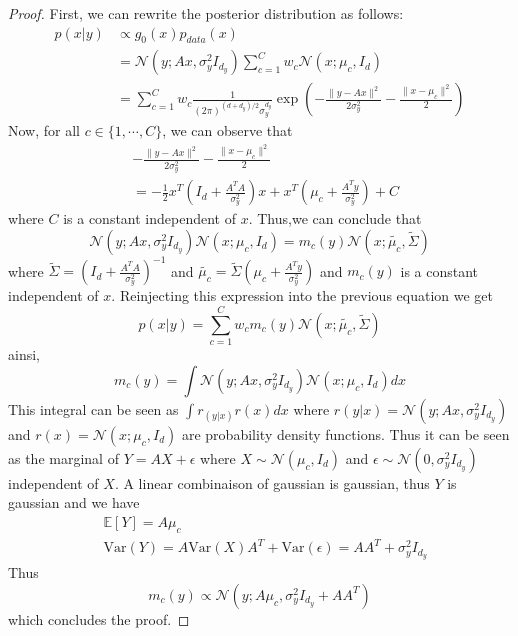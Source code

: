 \documentclass[12pt]{article}
\begin{document}
\begin{proof}
    First, we can rewrite the posterior distribution as follows:
    \begin{align*}
        p(x|y) 
        &\propto g_0(x) p_{data}(x) \\
        & = \mathcal{N}(y; Ax, \sigma_y^2 I_{d_y}) \sum_{c=1}^C w_c \mathcal{N}(x; \mu_c, I_d) \\
        & = \sum_{c=1}^C w_c \frac{1}{(2 \pi)^{(d + d_y)/2} \sigma_y^{d_y}} 
        \exp\left( -\frac{\| y - A x \|^2}{2 \sigma_y^2} - \frac{\| x - \mu_c \|^2}{2} \right)
    \end{align*}
    Now, for all $c \in \{1, \cdots, C\}$, we can observe that
    \begin{align*}
        & -\frac{\| y - A x \|^2}{2 \sigma_y^2} - \frac{\| x - \mu_c \|^2}{2} \\
        & = -\frac{1}{2} x^T (I_d + \frac{A^T A}{\sigma_y^2}) x + x^T (\mu_c + \frac{A^T y}{\sigma_y^2}) + C
    \end{align*}
    where $C$ is a constant independent of $x$. Thus,we can conclude that
    \begin{equation}
        \mathcal{N}(y; Ax, \sigma_y^2 I_{d_y}) \mathcal{N}(x; \mu_c, I_d)
        = m_c(y) \mathcal{N}(x; \tilde{\mu_c}, \tilde{\Sigma})
    \end{equation}
    where $\tilde{\Sigma} = (I_d + \frac{A^T A}{\sigma_y^2})^{-1}$ and 
    $\tilde{\mu_c} = \tilde{\Sigma} (\mu_c + \frac{A^T y}{\sigma_y^2})$ and $m_c(y)$ is a constant
    independent of $x$.
    Reinjecting this expression into the previous equation we get 
    \begin{equation}
        p(x|y) = \sum_{c=1}^C w_c m_c(y) \mathcal{N}(x; \tilde{\mu_c}, \tilde{\Sigma})
    \end{equation}
    ainsi,
    $$m_c(y) = \int  \mathcal{N}(y; Ax, \sigma_y^2 I_{d_y}) \mathcal{N}(x; \mu_c, I_d) dx$$
    This integral can be seen as $\int r_(y|x) r(x) dx$ where $r(y|x) = \mathcal{N}(y; Ax, \sigma_y^2 I_{d_y})$
    and $r(x) = \mathcal{N}(x; \mu_c, I_d)$ are probability density functions. Thus it can be seen as 
    the marginal of $Y = AX + \epsilon$
    where $X \sim \mathcal{N}(\mu_c, I_d)$ and $\epsilon \sim \mathcal{N}(0, \sigma_y^2 I_{d_y})$ 
    independent of $X$.
    A linear combinaison of gaussian is gaussian, thus $Y$ is gaussian and we have
    \begin{align*}
        & \mathbb{E}[Y] = A \mu_c \\
        & \text{Var}(Y) = A \text{Var}(X) A^T + \text{Var}(\epsilon) = A A^T + \sigma_y^2 I_{d_y}
    \end{align*}
    Thus 
    $$ m_c(y) \propto \mathcal{N}(y; A \mu_c, \sigma_y^2I_{d_y} + A A^T)$$
    which concludes the proof.
\end{proof}
\end{document}
